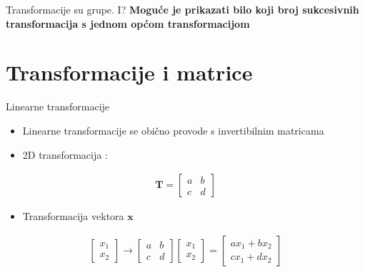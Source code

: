 \documentclass[9pt]{beamer}
\begin{document}
\begin{frame}{Transformacije su grupe. I?}
	\textbf{Moguće je prikazati bilo koji broj sukcesivnih transformacija s jednom općom transformacijom}
\end{frame}

\section{Transformacije i matrice}

\begin{frame}{Linearne transformacije}
	\begin{itemize}
		\item Linearne transformacije se obično provode s invertibilnim matricama%
		\item 2D transformacija : 
	\end{itemize}
	\begin{align*}
		\mathbf{T}= \left [ \begin{array}{cc}
		a & b  \\
		c & d  \end{array} \right]
	\end{align*}
	\begin{itemize}
		\item Transformacija vektora $\mathbf{x}$
	\end{itemize}
	\begin{align*}
		\left[ \begin{array}{c} x_{1} \\ x_{2}  \end{array} \right] \rightarrow 
		\left[ \begin{array}{cc}
		a & b  \\
		c & d  \end{array} \right] 	\left[ \begin{array}{c} x_{1} \\ x_{2}    \end{array} \right] = 
		\left[ \begin{array}{c}
		ax_{1} + bx_{2}  \\
		cx_{1} + dx_{2}  \end{array} \right]\nonumber
		\end{align*}
\end{frame}
\end{document}
